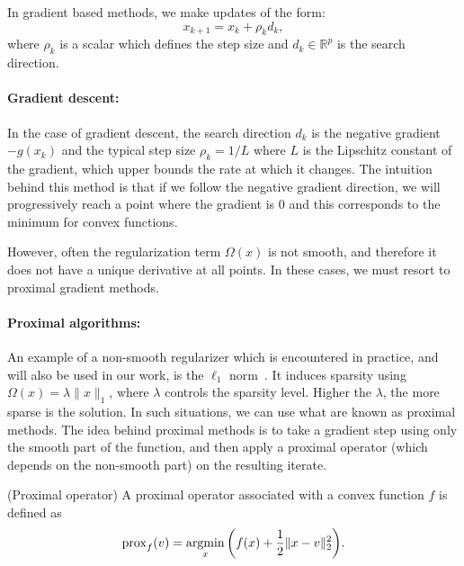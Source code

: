 In gradient based methods, we make updates of the  form:
%
\begin{equation}
x_{k + 1} = x_{k} + \rho_k d_k,
\label{eq:update_term}
\end{equation}
%
where $\rho_k$ is a scalar which defines the step size and $d_k \in \mathbb{R}^p$ is the search direction.

\paragraph{Gradient descent: } In the case of gradient descent, the search direction $d_k$ is the negative gradient $-g(x_k)$ and the typical step size $\rho_k=1/L$ where $L$ is the Lipschitz constant of the gradient, which upper bounds the rate at which it changes. The intuition behind this method is that if we follow the negative gradient direction, we will progressively reach a point where the gradient is 0 and this corresponds to the minimum for convex functions.

However, often the regularization term $\Omega(x)$ is not smooth, and therefore it does not have a unique derivative at all points. In these cases, we must resort to proximal gradient methods.

\paragraph{Proximal algorithms: } An example of a non-smooth regularizer which is encountered in practice, and will also be used in our work, is the $\ell_1$ norm~\citep{tibshirani1996regression}. It induces sparsity using $\Omega(x) = \lambda \|x\|_1$, where $\lambda$ controls the sparsity level. Higher the $\lambda$, the more sparse is the solution. In such situations, we can use what are known as proximal methods. The idea behind proximal methods is to take a gradient step using only the smooth part of the function, and then apply a proximal operator (which depends on the non-smooth part) on the resulting iterate. 

\vspace{\parskip}
\begin{definition}{(Proximal operator)}
A proximal operator associated with a convex function $f$ is defined as
\begin{equation}
\mathrm{prox}_f(v) = \mathop{\mathrm{argmin}}_x \bigg( f(x) + \frac{1}{2}\|x - v\|_2^2 \bigg).
\end{equation}
\end{definition}

